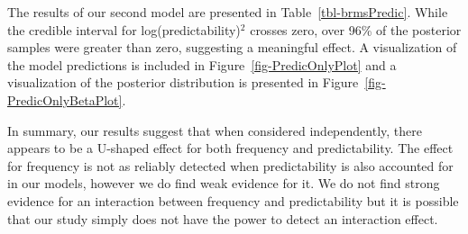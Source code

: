 \documentclass[
  authoryear,
  preprint,
  1p,
  onecolumn]{elsarticle}
\begin{document}
The results of our second model are presented in
Table~\ref{tbl-brmsPredic}. While the credible interval for
log(predictability)\(^2\) crosses zero, over 96\% of the posterior
samples were greater than zero, suggesting a meaningful effect. A
visualization of the model predictions is included in
Figure~\ref{fig-PredicOnlyPlot} and a visualization of the posterior
distribution is presented in Figure~\ref{fig-PredicOnlyBetaPlot}.

In summary, our results suggest that when considered independently,
there appears to be a U-shaped effect for both frequency and
predictability. The effect for frequency is not as reliably detected
when predictability is also accounted for in our models, however we do
find weak evidence for it. We do not find strong evidence for an
interaction between frequency and predictability but it is possible that
our study simply does not have the power to detect an interaction
effect.

\begin{table}

\caption{\label{tbl-brmsFreq}Results for the Bayesian quadratic
regression model containing only frequency and frequency\(^2\).}


\end{table}%

\begin{table}

\caption{\label{tbl-brmsPredic}Results for the Bayesian quadratic
regression model containing only predidctability and
predictability\(^2\).}


\end{table}%
\end{document}
